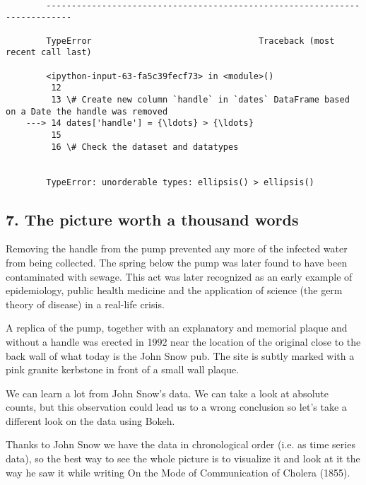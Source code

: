 \documentclass[11pt]{article}
\begin{document}
    \begin{Verbatim}[commandchars=\\\{\}]

        ---------------------------------------------------------------------------

        TypeError                                 Traceback (most recent call last)

        <ipython-input-63-fa5c39fecf73> in <module>()
         12 
         13 \# Create new column `handle` in `dates` DataFrame based on a Date the handle was removed 
    ---> 14 dates['handle'] = {\ldots} > {\ldots}
         15 
         16 \# Check the dataset and datatypes
    

        TypeError: unorderable types: ellipsis() > ellipsis()

    \end{Verbatim}

    \subsection{7. The picture worth a thousand
words}\label{the-picture-worth-a-thousand-words}

Removing the handle from the pump prevented any more of the infected
water from being collected. The spring below the pump was later found to
have been contaminated with sewage. This act was later recognized as an
early example of epidemiology, public health medicine and the
application of science (the germ theory of disease) in a real-life
crisis.

A replica of the pump, together with an explanatory and memorial plaque
and without a handle was erected in 1992 near the location of the
original close to the back wall of what today is the John Snow pub. The
site is subtly marked with a pink granite kerbstone in front of a small
wall plaque.

We can learn a lot from John Snow's data. We can take a look at absolute
counts, but this observation could lead us to a wrong conclusion so
let's take a different look on the data using Bokeh.

Thanks to John Snow we have the data in chronological order (i.e. as
time series data), so the best way to see the whole picture is to
visualize it and look at it the way he saw it while writing On the Mode
of Communication of Cholera (1855).
\end{document}
